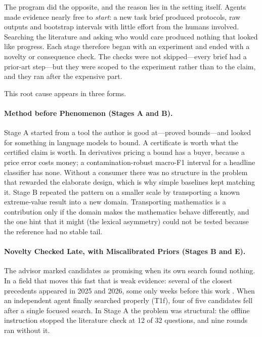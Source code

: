 \documentclass[11pt]{article}
\begin{document}
The program did the opposite, and the reason lies in the setting itself. Agents made evidence nearly free to \emph{start}: a new task brief produced protocols, raw outputs and bootstrap intervals with little effort from the humans involved. Searching the literature and asking who would care produced nothing that looked like progress. Each stage therefore began with an experiment and ended with a novelty or consequence check. The checks were not skipped---every brief had a prior-art step---but they were scoped to the experiment rather than to the claim, and they ran after the expensive part.

This root cause appears in three forms.

\paragraph{Method before Phenomenon (Stages A and B).} Stage A started from a tool the author is good at---proved bounds---and looked for something in language models to bound. A certificate is worth what the certified claim is worth. In derivatives pricing a bound has a buyer, because a price error costs money; a contamination-robust macro-F1 interval for a headline classifier has none. Without a consumer there was no structure in the problem that rewarded the elaborate design, which is why simple baselines kept matching it. Stage B repeated the pattern on a smaller scale by transporting a known extreme-value result into a new domain. Transporting mathematics is a contribution only if the domain makes the mathematics behave differently, and the one hint that it might (the lexical asymmetry) could not be tested because the reference had no stable tail.

\paragraph{Novelty Checked Late, with Miscalibrated Priors (Stages B and E).} The advisor marked candidates as promising when its own search found nothing. In a field that moves this fast that is weak evidence: several of the closest precedents appeared in 2025 and 2026, some only weeks before this work \citep{marks2026psychophysics,finesse2026,yan2026training,envcommons2026pr4}. When an independent agent finally searched properly (T1f), four of five candidates fell after a single focused search. In Stage A the problem was structural: the offline instruction stopped the literature check at 12 of 32 questions, and nine rounds ran without it.
\end{document}

